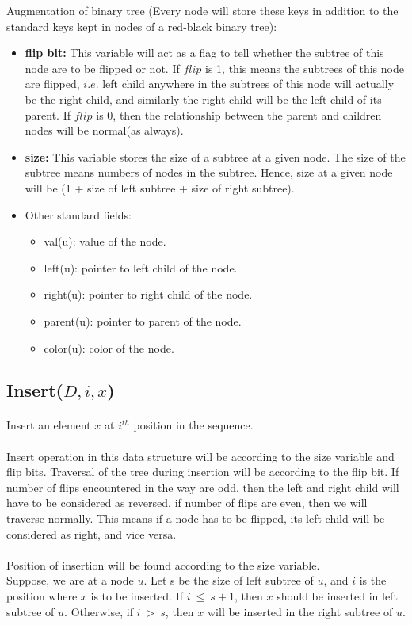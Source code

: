\documentclass[pdftex,a4paper,12pt]{report}
\begin{document}
Augmentation of binary tree (Every node will store these keys in addition to the standard keys kept in nodes of a 
red-black binary tree):
\begin{itemize}
	\item \textbf{flip bit:} This variable will act as a flag to tell whether the subtree
	 of this node are to be flipped or not. If $flip$ is 1, this means the subtrees of this node are flipped,
	 $i.e.$ left child anywhere in the subtrees of this node will actually be the right child, and similarly 
	 the right child will be the left child of its parent. If $flip$ is 0, then the relationship between the parent and 
	 children nodes will be normal(as always).
	
	\item \textbf{size:} This variable stores the size of a subtree at a given node. The size of the subtree means 
	numbers of nodes in the subtree. Hence, size at a given node will be (1 + size of left subtree + size of right subtree).
	
	\item Other standard fields:
		\begin{itemize}
			\item val(u): value of the node.
			\item left(u): pointer to left child of the node.
			\item right(u): pointer to right child of the node.
			\item parent(u): pointer to parent of the node.
			\item color(u): color of the node.
		\end{itemize}
\end{itemize}
\newpage
\subsection{Insert($D, i, x$)}
\paragraph{} Insert an element $x$ at $i^{th}$ position in the sequence.
\paragraph{} 
Insert operation in this data structure will be according to the size variable and flip bits.
Traversal of the tree during insertion will be according to the flip bit. If number of flips encountered 
in the way are odd, then the left and right child will have to be considered as reversed, if number of flips are
even, then we will traverse normally. This means if a node has to be flipped, its left child will be considered as 
right, and vice versa.\\\\
Position of insertion will be found according to the size variable.\\
Suppose, we are at a node $u$. Let s be the size of left subtree of $u$, and $i$ is the position where $x$ is to be 
inserted. If $i\ \leq\ s+1$, then $x$ should be inserted in left subtree of $u$. Otherwise, if $i\ >\ s$, 
then $x$ will be inserted in the right subtree of $u$.\\
\end{document}
